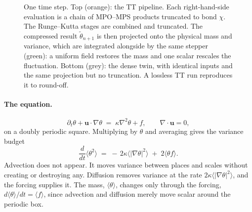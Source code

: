 \documentclass[aps,prfluids,reprint,onecolumn,amsmath,amssymb,nofootinbib,floatfix]{revtex4-2}
\begin{document}
\begin{figure}[t]
\caption{One time step. Top (orange): the TT pipeline. Each right-hand-side
evaluation is a chain of MPO--MPS products truncated to bond $\chi$. The
Runge--Kutta stages are combined and truncated. The compressed result
$\tilde\theta_{n+1}$ is then projected onto the physical mass and variance, which
are integrated alongside by the same stepper (green): a uniform field restores
the mass and one scalar rescales the fluctuation. Bottom (grey): the dense twin,
with identical inputs and the same projection but no truncation. A lossless TT
run reproduces it to round-off.}
\label{fig:step}
\end{figure}

\paragraph{The equation.}
\begin{equation}
\partial_t \theta + \mathbf{u}\!\cdot\!\nabla\theta \;=\; \kappa\nabla^2\theta + f,
\qquad \nabla\!\cdot\!\mathbf{u} = 0,
\label{eq:ps}
\end{equation}
on a doubly periodic square. Multiplying by $\theta$ and averaging gives the
variance budget
\begin{equation}
\frac{d}{dt}\langle\theta^2\rangle
\;=\; -\,2\kappa\big\langle|\nabla\theta|^2\big\rangle \;+\; 2\langle\theta f\rangle .
\label{eq:budget}
\end{equation}
Advection does not appear. It moves variance between places and scales without
creating or destroying any. Diffusion removes variance at the rate
$2\kappa\langle|\nabla\theta|^2\rangle$, and the forcing supplies it. The mass,
$\langle\theta\rangle$, changes only through the forcing,
$d\langle\theta\rangle/dt=\langle f\rangle$, since advection and diffusion
merely move scalar around the periodic box.
\end{document}
